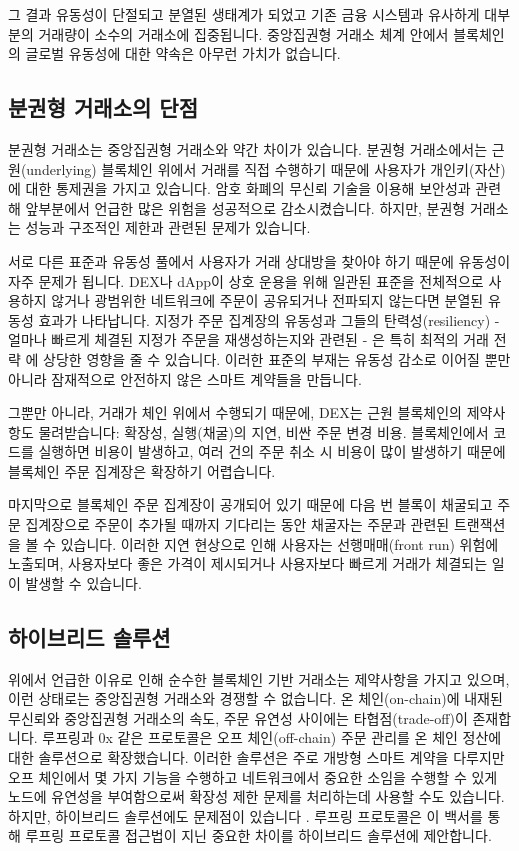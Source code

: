 \documentclass[UTF8,nofonts]{article}
\begin{document}
\begin{multicols}{2}
그 결과 유동성이 단절되고 분열된 생태계가 되었고 기존 금융 시스템과 유사하게 대부분의 거래량이 소수의 거래소에 집중됩니다. 중앙집권형 거래소 체계 안에서 블록체인의 글로벌 유동성에 대한 약속은 아무런 가치가 없습니다.  

\subsection{분권형 거래소의 단점}
분권형 거래소는 중앙집권형 거래소와 약간 차이가 있습니다. 분권형 거래소에서는 근원(underlying) 블록체인 위에서 거래를 직접 수행하기 때문에 사용자가 개인키(자산)에 대한 통제권을 가지고 있습니다. 암호 화폐의 무신뢰 기술을 이용해 보안성과 관련해 앞부분에서 언급한 많은 위험을 성공적으로 감소시켰습니다. 하지만, 분권형 거래소는 성능과 구조적인 제한과 관련된 문제가 있습니다.

서로 다른 표준과 유동성 풀에서 사용자가 거래 상대방을 찾아야 하기 때문에 유동성이 자주 문제가 됩니다. DEX나 dApp이 상호 운용을 위해 일관된 표준을 전체적으로 사용하지 않거나 광범위한 네트워크에 주문이 공유되거나 전파되지 않는다면 분열된 유동성 효과가 나타납니다. 지정가 주문 집계장의 유동성과 그들의 탄력성(resiliency) - 얼마나 빠르게 체결된 지정가 주문을 재생성하는지와 관련된 - 은 특히 최적의 거래 전략 \cite{limitorderliquidity} 에 상당한 영향을 줄 수 있습니다. 이러한 표준의 부재는 유동성 감소로 이어질 뿐만 아니라 잠재적으로 안전하지 않은 스마트 계약들을 만듭니다.

그뿐만 아니라, 거래가 체인 위에서 수행되기 때문에, DEX는 근원 블록체인의 제약사항도 물려받습니다: 확장성, 실행(채굴)의 지연, 비싼 주문 변경 비용. 블록체인에서 코드를 실행하면 비용이 발생하고, 여러 건의 주문 취소 시 비용이 많이 발생하기 때문에 블록체인 주문 집계장은 확장하기 어렵습니다.   

마지막으로 블록체인 주문 집계장이 공개되어 있기 때문에 다음 번 블록이 채굴되고 주문 집계장으로 주문이 추가될 때까지 기다리는 동안 채굴자는 주문과 관련된 트랜잭션을 볼 수 있습니다. 이러한 지연 현상으로 인해 사용자는 선행매매(front run) 위험에 노출되며, 사용자보다 좋은 가격이 제시되거나 사용자보다 빠르게 거래가 체결되는 일이 발생할 수 있습니다.

\subsection{하이브리드 솔루션}
위에서 언급한 이유로 인해 순수한 블록체인 기반 거래소는 제약사항을 가지고 있으며, 이런 상태로는 중앙집권형 거래소와 경쟁할 수 없습니다. 온 체인(on-chain)에 내재된 무신뢰와 중앙집권형 거래소의 속도, 주문 유연성 사이에는 타협점(trade-off)이 존재합니다. 루프링과 0x \cite{warren20170x} 같은 프로토콜은 오프 체인(off-chain) 주문 관리를 온 체인 정산에 대한 솔루션으로 확장했습니다. 이러한 솔루션은 주로 개방형 스마트 계약을 다루지만 오프 체인에서 몇 가지 기능을 수행하고 네트워크에서 중요한 소임을 수행할 수 있게 노드에 유연성을 부여함으로써 확장성 제한 문제를 처리하는데 사용할 수도 있습니다. 하지만, 하이브리드 솔루션에도 문제점이 있습니다 \cite{costofdecent}. 루프링 프로토콜은 이 백서를 통해 루프링 프로토콜 접근법이 지닌 중요한 차이를 하이브리드 솔루션에 제안합니다.


\end{multicols}
\end{document}

